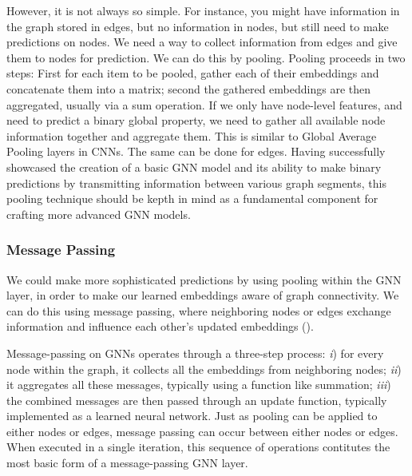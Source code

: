 \documentclass[binding=0.6cm]{sapthesis}
\newcommand{\mycite}[1]{(\cite{#1})}
\begin{document}
However, it is not always so simple. For instance, you might have information in the graph stored in edges, but no information in nodes, but still need to make predictions on nodes. We need a way to collect information from edges and give them to nodes for prediction. We can do this by pooling. Pooling proceeds in two steps: First for each item to be pooled, gather each of their embeddings and concatenate them into a matrix; second the gathered embeddings are then aggregated, usually via a sum operation. If we only have node-level features, and need to predict a binary global property, we need to gather all available node information together and aggregate them. This is similar to Global Average Pooling layers in CNNs. The same can be done for edges. Having successfully showcased the creation of a basic GNN model and its ability to make binary predictions by transmitting information between various graph segments, this pooling technique should be kepth in mind as a fundamental component for crafting more advanced GNN models.

\subsubsection{Message Passing}
\label{sec:bg.gnn.message-passing}
We could make more sophisticated predictions by using pooling within the GNN layer, in order to make our learned embeddings aware of graph connectivity. We can do this using message passing, where neighboring nodes or edges exchange information and influence each other’s updated embeddings \mycite{gilmer2017-message-passing}.

Message-passing on GNNs operates through a three-step process: \textit{i}) for every node within the graph, it collects all the embeddings from neighboring nodes; \textit{ii}) it aggregates all these messages, typically using a function like summation; \textit{iii}) the combined messages are then passed through an update function, typically implemented as a learned neural network. Just as pooling can be applied to either nodes or edges, message passing can occur between either nodes or edges. When executed in a single iteration, this sequence of operations contitutes the most basic form of a message-passing GNN layer.
\end{document}
